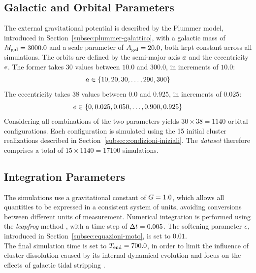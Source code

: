 \subsection{Galactic and Orbital Parameters}
\label{subsec:parametri-orbitali}
The external gravitational potential is described by the Plummer model, introduced in Section~\ref{subsec:plummer-galattico}, with a galactic mass of $M_{\mathrm{gal}}=3000.0$ and a scale parameter of $A_{\mathrm{gal}}=20.0$, both kept constant across all simulations.
The orbits are defined by the semi-major axis $a$ and the eccentricity $e$. The former takes 30 values between $10.0$ and $300.0$, in increments of $10.0$:
\[
a \in \{10,20,30,\ldots,290,300\}
\]
The eccentricity takes 38 values between $0.0$ and $0.925$, in increments of $0.025$:
\[
e\in\{0,0.025,0.050,\ldots,0.900,0.925\}
\]
Considering all combinations of the two parameters yields $30\times38=1140$ orbital configurations. Each configuration is simulated using the 15 initial cluster realizations described in Section~\ref{subsec:condizioni-iniziali}. The \emph{dataset} therefore comprises a total of $15\times1140=17100$ simulations.
\subsection{Integration Parameters}
\label{subsec:parametri-integrazione}
The simulations use a gravitational constant of $G=1.0$, which allows all quantities to be expressed in a consistent system of units, avoiding conversions between different units of measurement. Numerical integration is performed using the \emph{leapfrog} method \cite{hairer2006geometric}, with a time step of $\Delta t=0.005$. The softening parameter $\epsilon$, introduced in Section~\ref{subsec:equazioni-moto}, is set to $0.01$.\\
The final simulation time is set to $T_{\mathrm{end}}=700.0$, in order to limit the influence of cluster dissolution caused by its internal dynamical evolution and focus on the effects of galactic tidal stripping \cite{cai2016evolution}.
